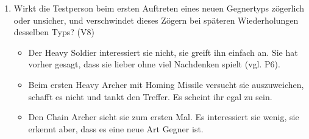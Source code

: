 \documentclass[../Main.tex]{subfiles}
\begin{document}
\begin{enumerate}[label=\textbf{B\arabic*}, leftmargin=1.5cm, itemsep=0.8em, resume]
    \item Wirkt die Testperson beim ersten Auftreten eines neuen Gegnertyps zögerlich oder unsicher, und verschwindet dieses Zögern bei späteren Wiederholungen desselben Typs? \hfill (V8)
    \begin{itemize}[nosep]
        \item Der Heavy Soldier interessiert sie nicht, sie greift ihn einfach an. Sie hat vorher gesagt, dass sie lieber ohne viel Nachdenken spielt (vgl. P6).
        \item Beim ersten Heavy Archer mit Homing Missile versucht sie auszuweichen, schafft es nicht und tankt den Treffer. Es scheint ihr egal zu sein.
        \item Den Chain Archer sieht sie zum ersten Mal. Es interessiert sie wenig, sie erkennt aber, dass es eine neue Art Gegner ist.
    \end{itemize}
\end{enumerate}
\end{document}
